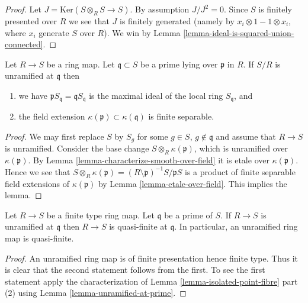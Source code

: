 \begin{proof}
Let $J = \text{Ker}(S \otimes_R S \to S)$. By assumption
$J/J^2 = 0$. Since $S$ is finitely presented over $R$ we
see that $J$ is finitely generated (namely by
$x_i \otimes 1 - 1 \otimes x_i$, where $x_i$ generate $S$ over $R$).
We win by Lemma \ref{lemma-ideal-is-squared-union-connected}.
\end{proof}

\begin{lemma}
\label{lemma-unramified-at-prime}
Let $R \to S$ be a ring map.
Let $\mathfrak q \subset S$ be
a prime lying over $\mathfrak p$ in $R$.
If $S/R$ is unramified at $\mathfrak q$ then
\begin{enumerate}
\item we have $\mathfrak p S_{\mathfrak q} = \mathfrak qS_{\mathfrak q}$
is the maximal ideal of the local ring $S_{\mathfrak q}$, and
\item the field extension $\kappa(\mathfrak p) \subset \kappa(\mathfrak q)$
is finite separable.
\end{enumerate}
\end{lemma}

\begin{proof}
We may first replace $S$ by $S_g$ for some $g \in S$, $g \not \in \mathfrak q$
and assume that $R \to S$ is unramified.
Consider the base change $S \otimes_R \kappa(\mathfrak p)$, which
is unramified over $\kappa(\mathfrak p)$.
By Lemma \ref{lemma-characterize-smooth-over-field} it is etale
over $\kappa(\mathfrak p)$.
Hence we see that
$S \otimes_R \kappa(\mathfrak p)
= (R \setminus \mathfrak p)^{-1} S/\mathfrak pS$
is a product of finite separable field extensions of
$\kappa(\mathfrak p)$ by Lemma \ref{lemma-etale-over-field}.
This implies the lemma.
\end{proof}

\begin{lemma}
\label{lemma-unramified-quasi-finite}
Let $R \to S$ be a finite type ring map.
Let $\mathfrak q$ be a prime of $S$.
If $R \to S$ is unramified at $\mathfrak q$ then
$R \to S$ is quasi-finite at $\mathfrak q$.
In particular, an unramified ring map is quasi-finite.
\end{lemma}

\begin{proof}
An unramified ring map is of finite presentation hence finite type.
Thus it is clear that the second statement follows from the first.
To see the first statement apply the characterization of
Lemma \ref{lemma-isolated-point-fibre} part (2) using
Lemma \ref{lemma-unramified-at-prime}.
\end{proof}

